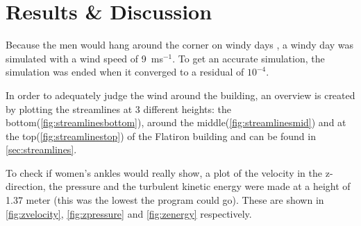\section{Results \& Discussion}
\label{sec:results}
Because the men would hang around the corner on windy days \cite{dresses}, a windy day was simulated with a wind speed of 9~ms$^{-1}$. To get an accurate simulation, the simulation was ended when it converged to a residual of $10^{-4}$. 

In order to adequately judge the wind around the building, an overview is created by plotting the streamlines at 3 different heights: the bottom(\autoref{fig:streamlinesbottom}), around the middle(\autoref{fig:streamlinesmid}) and at the top(\autoref{fig:streamlinestop}) of the Flatiron building and can be found in \autoref{sec:streamlines}.

To check if women's ankles would really show, a plot of the velocity in the z-direction, the pressure and the turbulent kinetic energy were made at a height of 1.37 meter (this was the lowest the program could go). These are shown in \autoref{fig:zvelocity}, \ref{fig:zpressure} and \ref{fig:zenergy} respectively.

